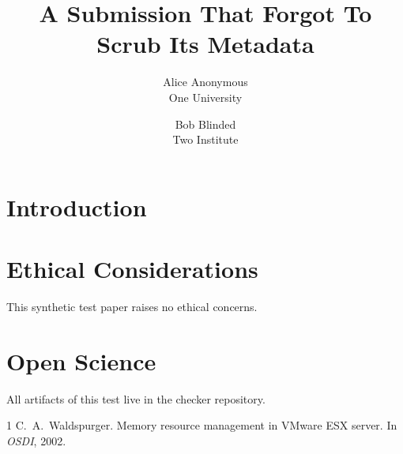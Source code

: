 \documentclass[letterpaper,twocolumn,10pt]{article}
\date{}
\title{\Large \bf A Submission That Forgot To Scrub Its Metadata}
\author{{\rm Alice Anonymous}\\One University \and {\rm Bob Blinded}\\Two Institute}
\begin{document}
\maketitle

\begin{abstract}
\lipsum[1][1-5]
\end{abstract}

\section{Introduction}
\lipsum[2-4]

\appendix
\section*{Ethical Considerations}
This synthetic test paper raises no ethical concerns.

\section*{Open Science}
All artifacts of this test live in the checker repository.

\begin{thebibliography}{1}
 C.~A.\ Waldspurger. Memory resource management in VMware ESX
  server. In \emph{OSDI}, 2002.
\end{thebibliography}
\end{document}

